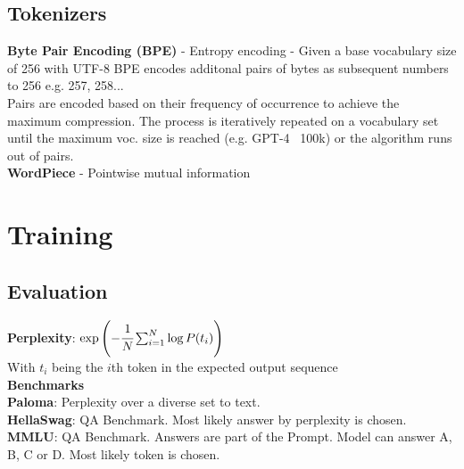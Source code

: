 \begin{multicols}{2}
\begin{mdframed}[style=eqbox]
        \subsection{Tokenizers}
        \textbf{Byte Pair Encoding (BPE)} - Entropy encoding - Given a base vocabulary size of 256 with UTF-8 BPE encodes additonal pairs of bytes as subsequent numbers to 256 e.g. 257, 258...\\
        Pairs are encoded based on their frequency of occurrence to achieve the maximum compression. The process is iteratively repeated on a vocabulary set until the maximum voc. size is reached (e.g. GPT-4 ~100k) or the algorithm runs out of pairs.\\
        \textbf{WordPiece} - Pointwise mutual information
    \end{mdframed}
\vfill\null
\columnbreak
    \section{Training}
    \begin{mdframed}[style=eqbox]
        \subsection{Evaluation}
        \textbf{Perplexity}: $\exp\left( - \cfrac{1}{N} \sum_{i=1}^{N} \log P(t_i)\right)$\\
        {\tiny With $t_i$ being the $i$th token in the expected output sequence}\\[0.5em]
        \textbf{Benchmarks}\\
        \textbf{Paloma}: Perplexity over a diverse set to text.\\
        \textbf{HellaSwag}: QA Benchmark. Most likely answer by perplexity is chosen.\\
        \textbf{MMLU}: QA Benchmark. Answers are part of the Prompt. Model can answer A, B, C or D. Most likely token is chosen.
    \end{mdframed}

    \begin{mdframed}[style=eqbox]

\end{mdframed}
\end{multicols}
